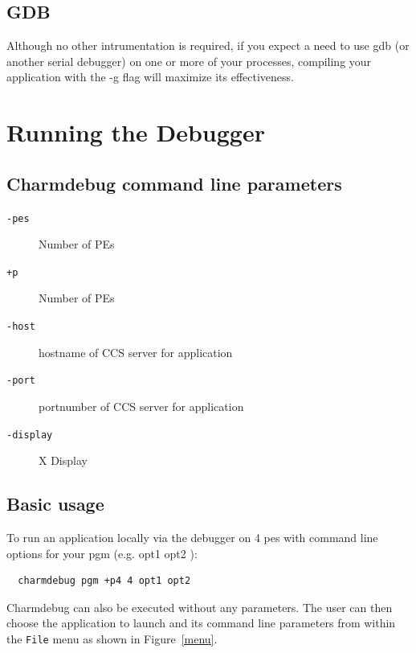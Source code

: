 \documentclass[10pt,dvips]{article}
\begin{document}
\subsection{GDB}

Although no other intrumentation is required, if you expect a need to
use gdb (or another serial debugger) on one or more of your processes,
compiling your application with the -g flag will maximize its
effectiveness.

\section{Running the Debugger}

\subsection{Charmdebug command line parameters}

\begin{description}

\item[{\tt -pes}] Number of PEs 

\item[{\tt +p}] Number of PEs 

\item[{\tt -host}] hostname of CCS server for application

\item[{\tt -port}] portnumber of CCS server for application

\item[{\tt -display}] X Display

\end{description}

\subsection{Basic usage}

To run an application locally via the debugger on 4 pes with command line options for your pgm (e.g. opt1 opt2 ):

\begin{verbatim}
  charmdebug pgm +p4 4 opt1 opt2
\end{verbatim}

Charmdebug can also be executed without any parameters.  The user can
then choose the application to launch and its command line parameters
from within the \texttt{File} menu as shown in Figure~\ref{menu}.
\end{document}
